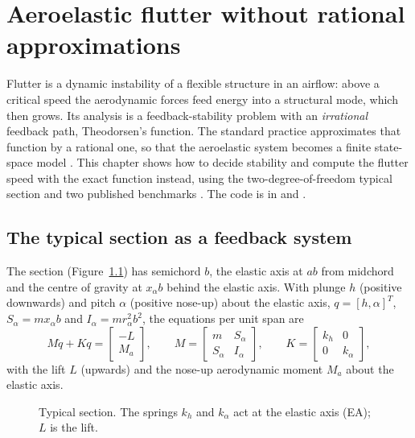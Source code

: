 \chapter{Aeroelastic flutter without rational approximations}\label{ch:aero}

Flutter is a dynamic instability of a flexible structure in an airflow:
above a critical speed the aerodynamic forces feed energy into a structural
mode, which then grows. Its analysis is a feedback-stability problem with an
\emph{irrational} feedback path, Theodorsen's function. The standard
practice approximates that function by a rational one, so that the
aeroelastic system becomes a finite state-space model
\citep{edwards1977,kaiser2022}. This chapter shows how to decide stability
and compute the flutter speed with the exact function instead, using the
two-degree-of-freedom typical section and two published benchmarks
\citep{perry2015,kaiser2022}. The code is in
 and .

\section{The typical section as a feedback system}

The section (Figure~\ref{fig:section}) has semichord $b$, the elastic axis
at $ab$ from midchord and the centre of gravity at $x_\alpha b$ behind the
elastic axis. With plunge $h$ (positive downwards) and pitch $\alpha$
(positive nose-up) about the elastic axis, $q=[h,\alpha]^T$,
$S_\alpha=mx_\alpha b$ and $I_\alpha=mr_\alpha^2b^2$, the equations per unit
span are
\begin{equation}
  M\ddot q+Kq=\begin{bmatrix}-L\\ M_a\end{bmatrix},\qquad
  M=\begin{bmatrix}m&S_\alpha\\S_\alpha&I_\alpha\end{bmatrix},\qquad
  K=\begin{bmatrix}k_h&0\\0&k_\alpha\end{bmatrix},
\end{equation}
with the lift $L$ (upwards) and the nose-up aerodynamic moment $M_a$ about
the elastic axis.

\begin{figure}[H]
\centering

\caption{Typical section. The springs $k_h$ and $k_\alpha$ act at the
elastic axis (EA); $L$ is the lift.}
\label{fig:section}
\end{figure}

